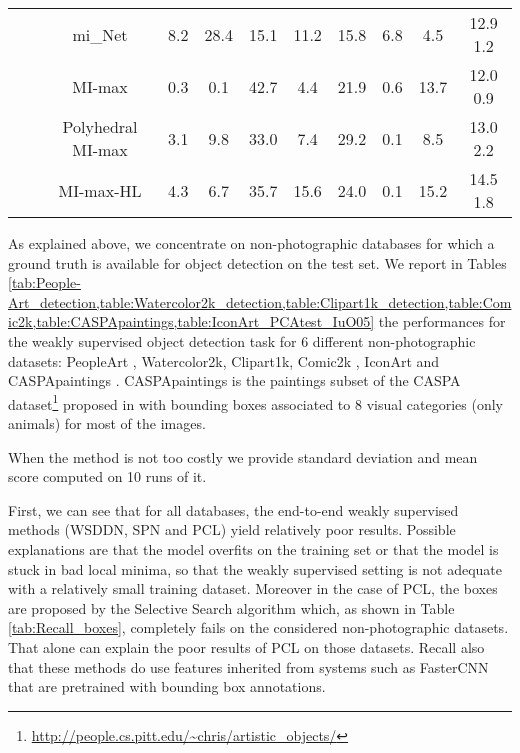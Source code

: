 \documentclass[preprint]{elsarticle}
\newcommand\MILS{MI-max}
\newcommand\mimaxaddlayerS{MI-max-HL}
\newcommand\MaxOfMaxS{Polyhedral MI-max}
\begin{document}
\begin{savenotes}
\begin{table*}[h]
{\begin{tabular}{|c|c|c|ccccccc|c|}
& & mi\_Net \citep{wang_revisiting_2018} & 8.2   & 28.4   & 15.1   & 11.2   & 15.8   & 6.8  & 4.5   & 12.9    1.2   \\ 
\cline{3-11}
& & \MILS{}   & 0.3   & 0.1  & 42.7   & 4.4 & 21.9   & 0.6  & 13.7   & 12.0    0.9   \\ 
& & \MaxOfMaxS{} & 3.1   & 9.8   & 33.0  & 7.4   & 29.2   & 0.1 & 8.5   &  13.0   2.2   \\  
& & \mimaxaddlayerS{}  & 4.3  & 6.7  & 35.7  & 15.6  & 24.0  & 0.1  & 15.2  &  14.5   1.8   \\
\hline
\end{tabular}
}
\end{table*}
\end{savenotes}


As explained above, we concentrate on non-photographic databases for which a ground truth is available for object detection on the test set. We report in Tables \cref{tab:People-Art_detection,table:Watercolor2k_detection,table:Clipart1k_detection,table:Comic2k,table:CASPApaintings,table:IconArt_PCAtest_IuO05}  the performances for the weakly supervised object detection task for 6 different non-photographic datasets: PeopleArt \citep{westlake_detecting_2016}, Watercolor2k, Clipart1k, Comic2k \citep{inoue_crossdomain_2018}, IconArt \citep{gonthier_weakly_2018} and CASPApaintings \citep{thomas_artistic_2018}.
CASPApaintings is the paintings subset of the CASPA dataset\footnote{\url{http://people.cs.pitt.edu/~chris/artistic_objects/}} proposed in \citep{thomas_artistic_2018} with bounding boxes associated to 8 visual categories (only animals) for most of the images. 

When the method is not too costly we provide standard deviation and mean score computed on 10 runs of it. 

First, we can see that for all databases, the end-to-end weakly  supervised methods (WSDDN, SPN and PCL) yield relatively poor results. Possible explanations are that the model overfits on the training set or that the model is stuck in bad local minima, so that the weakly supervised setting is not adequate with a relatively small training dataset.
Moreover in the case of PCL, the boxes are proposed by the Selective Search algorithm \citep{uijlings_selective_2013} which, as shown in Table \ref{tab:Recall_boxes}, completely fails on the considered non-photographic datasets. That alone can explain the poor results of PCL on those datasets. Recall also that these methods do use features inherited from systems such as FasterCNN that are pretrained with bounding box annotations.
\end{document}

